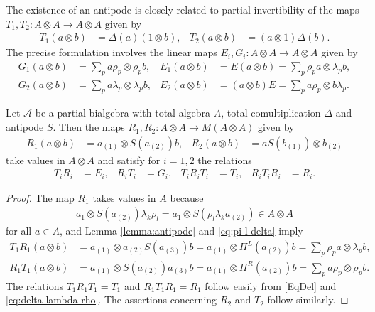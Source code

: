 The existence of an antipode is closely related to partial invertibility of
the maps $T_{1},T_{2} \colon A \otimes A \to A\otimes A$ given by
\begin{align} \label{eq:wt-12}
  T_{1} (a\otimes b)&= \Delta(a)(1 \otimes b), &
  T_{2} (a\otimes b)&= (a \otimes 1)\Delta(b).
 \end{align}
The precise formulation involves the linear maps $E_{i},G_{i}
 \colon A\otimes A\to A\otimes A$ given by
\begin{align} \label{eq:e1g1}
  G_{1}(a\otimes b) &=
 \sum_{p} a\rho_{p} \otimes \rho_{p}b, &  E_{1}(a \otimes b) &=E(a\otimes b)=\sum_{p} \rho_{p}a\otimes \lambda_{p}b, \\ \label{eq:e2g2}
 G_{2}(a \otimes b) &= \sum_{p} a\lambda_{p} \otimes
    \lambda_{p}b, &
E_{2}(a\otimes b) &= (a\otimes b)E=\sum_{p} a\rho_{p} \otimes b\lambda_{p}.
\end{align}
\begin{Prop} \label{prop:riti}
  Let $\mathscr{A}$ be a partial bialgebra with total algebra $A$,
  total comultiplication $\Delta$ and antipode  $S$. Then the maps
  $R_{1},R_{2} \colon A \otimes A \to M(A \otimes A)$ given by
  \begin{align*}
    R_{1}(a \otimes b) &= a_{(1)}\otimes S(a_{(2)})b, &
    R_{2}(a\otimes b) &= aS(b_{(1)})\otimes b_{(2)}
  \end{align*}
  take values in $A\otimes A$ and satisfy for $i=1,2$ the relations
  \begin{align} \label{eq:riti}
    T_{i}R_{i}&=E_{i}, & R_{i}T_{i}&= G_{i}, & T_{i}R_{i}T_{i}&= T_{i}, & R_{i}T_{i}R_{i} &= R_{i}.
  \end{align}
\end{Prop}
\begin{proof}
  The map $R_{1}$ takes values in $A$ because
  \begin{align*}
  a_{1} \otimes
  S(a_{(2)})\lambda_{k}\rho_{l} =  a_{1} \otimes S(\rho_{l}\lambda_{k}a_{(2)}) \in A
  \otimes A
  \end{align*}
  for all $a\in A$, and Lemma
  \ref{lemma:antipode} and \eqref{eq:pi-l-delta} imply
  \begin{align*}
    T_{1}R_{1}(a \otimes b)&= a_{(1)} \otimes a_{(2)}S(a_{(3)})b =
    a_{(1)} \otimes \Pi^{L}(a_{(2)})b =
    \sum_{p} \rho_{p}a \otimes \lambda_{p}b, \\
    R_{1}T_{1}(a \otimes b) &= a_{(1)} \otimes S(a_{(2)})a_{(3)}b =
    a_{(1)} \otimes \Pi^{R}(a_{(2)})b = \sum_{p} a\rho_{p}\otimes
    \rho_{p}b.
  \end{align*}
 The relations $T_{1}R_{1}T_{1}=T_{1}$ and
$R_{1}T_{1}R_{1}=R_{1}$ follow easily from  \eqref{EqDel} and
\eqref{eq:delta-lambda-rho}. The assertions concerning $R_{2}$ and
$T_{2}$ follow similarly.
\end{proof}
